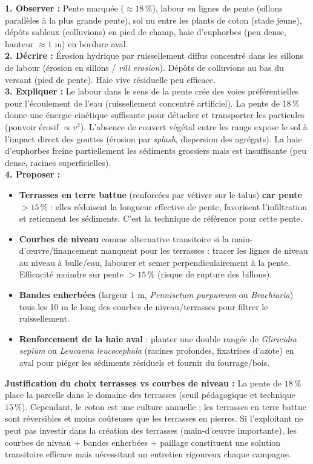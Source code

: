 \documentclass[11pt]{article}
\begin{document}
\begin{corrige}[Exercice n°1]
\textbf{1. Observer :} Pente marquée ($\approx 18\,\%$), labour en lignes de pente (sillons parallèles à la plus grande pente), sol nu entre les plants de coton (stade jeune), dépôts sableux (colluvions) en pied de champ, haie d'euphorbes (peu dense, hauteur $\approx 1$ m) en bordure aval.\\
\textbf{2. Décrire :} Érosion hydrique par ruissellement diffus concentré dans les sillons de labour (érosion en sillons / \emph{rill erosion}). Dépôts de colluvions au bas du versant (pied de pente). Haie vive résiduelle peu efficace.\\
\textbf{3. Expliquer :} Le labour dans le sens de la pente crée des voies préférentielles pour l'écoulement de l'eau (ruissellement concentré artificiel). La pente de $18\,\%$ donne une énergie cinétique suffisante pour détacher et transporter les particules (pouvoir érosif $\propto v^2$). L'absence de couvert végétal entre les rangs expose le sol à l'impact direct des gouttes (érosion par \emph{splash}, dispersion des agrégats). La haie d'euphorbes freine partiellement les sédiments grossiers mais est insuffisante (peu dense, racines superficielles).\\
\textbf{4. Proposer :} 
\begin{itemize}
\item \textbf{Terrasses en terre battue} (renforcées par vétiver sur le talus) \textbf{car pente $> 15\,\%$} : elles réduisent la longueur effective de pente, favorisent l'infiltration et retiennent les sédiments. C'est la technique de référence pour cette pente.
\item \textbf{Courbes de niveau} comme alternative transitoire si la main-d'œuvre/financement manquent pour les terrasses : tracer les lignes de niveau au niveau à bulle/eau, labourer et semer perpendiculairement à la pente. Efficacité moindre sur pente $> 15\,\%$ (risque de rupture des billons).
\item \textbf{Bandes enherbées} (largeur 1 m, \emph{Pennisetum purpureum} ou \emph{Brachiaria}) tous les 10 m le long des courbes de niveau/terrasses pour filtrer le ruissellement.
\item \textbf{Renforcement de la haie aval} : planter une double rangée de \emph{Gliricidia sepium} ou \emph{Leucaena leucocephala} (racines profondes, fixatrices d'azote) en aval pour piéger les sédiments résiduels et fournir du fourrage/bois.
\end{itemize}
\textbf{Justification du choix terrasses vs courbes de niveau :} La pente de $18\,\%$ place la parcelle dans le domaine des terrasses (seuil pédagogique et technique $15\,\%$). Cependant, le coton est une culture annuelle ; les terrasses en terre battue sont réversibles et moins coûteuses que les terrasses en pierres. Si l'exploitant ne peut pas investir dans la création des terrasses (main-d'œuvre importante), les courbes de niveau + bandes enherbées + paillage constituent une solution transitoire efficace mais nécessitant un entretien rigoureux chaque campagne.
\end{corrige}
\end{document}
